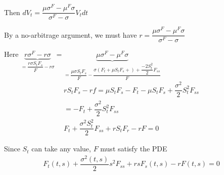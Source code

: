\par\bigskip
\noindent Then $dV_t = \dfrac{\mu \sigma^F-\mu^F\sigma}{\sigma^F - \sigma}V_t dt$\par
\noindent By a no-arbitrage argument, we must have $r = \dfrac{\mu \sigma^F-\mu^F\sigma}{\sigma^F - \sigma}$
\par\bigskip
\noindent Here $\underbrace{r\sigma^F-r\sigma}_{= \dfrac{r\sigma S_tF_s}{F}-r\sigma} = \underbrace{\mu\sigma^F-\mu^F\sigma}_{= \dfrac{\mu\sigma S_tF_s}{F}-\dfrac{\sigma(F_t+\mu S_tF_s+)+\dfrac{-2S_t^2}{2}F_{ss}}{F}}$
\begin{equation*}
  \begin{gathered}
    rS_tF_s -rf = \mu S_tF_s - F_t -\mu S_tF_s +\dfrac{\sigma^2}{2}S_t^2F_{ss}\\
    = -F_t+\dfrac{\sigma^2}{2}S_t^2F_{ss}\\
    F_t + \dfrac{\sigma^2S_t^2}{2}F_{ss}+rS_tF_r - rF=0
  \end{gathered}
\end{equation*}\par
\noindent Since $S_t$ can take any value, $F$ must satisfy the PDE
\begin{equation*}
  \begin{gathered}
    F_t(t,s)+\dfrac{\sigma^2(t,s)}{2}s^2F_{ss}+rsF_s(t,s)-rF(t,s) = 0
  \end{gathered}
\end{equation*}\par

